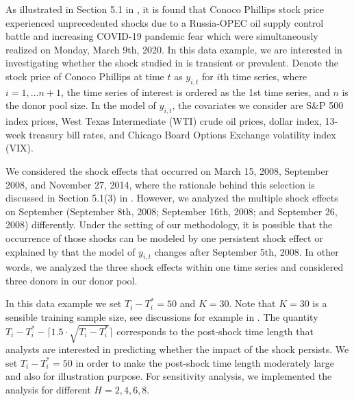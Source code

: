 \documentclass[11pt]{article}
\newcommand{\ceil}[1]{\lceil #1 \rceil}
\theoremstyle{definition}
\begin{document}
\label{sptcop}



As illustrated in Section 5.1 in \cite{lin2021minimizing}, it is found that Conoco Phillips stock price experienced unprecedented shocks due to a Russia-OPEC oil supply control battle and increasing COVID-19 pandemic fear which were simultaneously realized on Monday, March 9th, 2020. In this data example, we are interested in investigating whether the shock studied in \cite{lin2021minimizing} is transient or prevalent. Denote the stock price of Conoco Phillips at time $t$ as $y_{i,t}$ for $i$th time series, where $i = 1, \ldots n+1$, the time series of interest is ordered as the 1st time series, and $n$ is the donor pool size. In the model of $y_{i,t}$, the covariates we consider are S\&P 500 index prices, West Texas Intermediate (WTI) crude oil prices, dollar index, 13-week treasury bill rates, and Chicago Board Options Exchange volatility index (VIX). 

We considered the shock effects that occurred on March 15, 2008, September 2008, and November 27, 2014, where the rationale behind this selection is discussed in Section 5.1(3) in  \cite{lin2021minimizing}. However, we analyzed the multiple shock effects on September (September 8th, 2008; September 16th, 2008; and September 26, 2008) differently. Under the  setting of our methodology, it is possible that the occurrence of  those shocks can be modeled by one persistent shock effect or explained by that the model of $y_{i,t}$ changes after September 5th, 2008. In other words, we analyzed the three shock effects within one time series and considered three donors in our donor pool. 

In this data example we set $T_i- T_i^* = 50$ and $K = 30$. Note that $K = 30$ is a sensible  training sample size, see discussions for example in  \cite{lin2021minimizing}. The quantity $T_i-T_i^*-\ceil{1.5 \cdot \sqrt{T_i-T_i^*}}$ corresponds to the post-shock time length that analysts are interested in predicting whether the impact of the shock persists.  We set $T_i- T_i^* = 50$  in order to make the post-shock time length moderately large and also for illustration purpose. For sensitivity analysis, we implemented the analysis for different  $H= 2, 4, 6, 8$.
\end{document}
